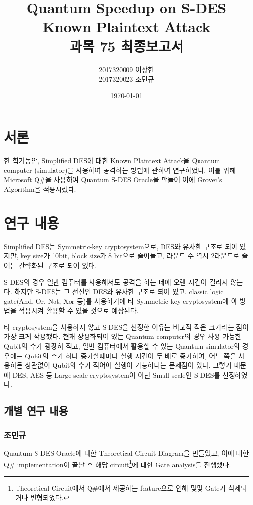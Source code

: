 \documentclass{article}
\title{Quantum Speedup on S-DES Known Plaintext Attack\\\large 과목 75 최종보고서}
\author{2017320009 이상헌\\2017320023 조민규}
\date{\today}
\theoremstyle{break}
\begin{document}
	\maketitle
	
	\section{서론}
	
	한 학기동안, Simplified DES에 대한 Known Plaintext Attack을 Quantum computer (simulator)을 사용하여 공격하는 방법에 관하여 연구하였다. 이를 위해 Microsoft Q\#을 사용하여 Quantum S-DES Oracle을 만들어 이에 Grover’s Algorithm을 적용시켰다.
	
	\section{연구 내용}
	
	Simplified DES는 Symmetric-key cryptosystem으로, DES와 유사한 구조로 되어 있지만, key size가 10bit, block size가 8 bit으로 줄어들고, 라운드 수 역시 2라운드로 줄어든 간략화된 구조로 되어 있다.
	
	S-DES의 경우 일반 컴퓨터를 사용해서도 공격을 하는 데에 오랜 시간이 걸리지 않는다. 하지만 S-DES는 그 전신인 DES와 유사한 구조로 되어 있고, classic logic gate(And, Or, Not, Xor 등)를 사용하기에 타 Symmetric-key cryptosystem에 이 방법을 적용시켜 활용할 수 있을 것으로 예상된다.
	
	타 cryptosystem을 사용하지 않고 S-DES을 선정한 이유는 비교적 작은 크기라는 점이 가장 크게 작용했다. 현재 상용화되어 있는 Quantum computer의 경우 사용 가능한 Qubit의 수가 굉장히 적고, 일반 컴퓨터에서 활용할 수 있는 Quantum simulator의 경우에는 Qubit의 수가 하나 증가할때마다 실행 시간이 두 배로 증가하여, 어느 쪽을 사용하든 상관없이 Qubit의 수가 적어야 실행이 가능하다는 문제점이 있다. 그렇기 때문에 DES, AES 등 Large-scale cryptosystem이 아닌 Small-scale인 S-DES를 선정하였다.
	
	\subsection{개별 연구 내용}
	
	\subsubsection{조민규}
	
	Quantum S-DES Oracle에 대한 Theoretical Circuit Diagram을 만들었고, 이에 대한 Q\# implementation이 끝난 후 해당 circuit\footnote{Theoretical Circuit에서 Q\#에서 제공하는 feature으로 인해 몇몇 Gate가 삭제되거나 변형되었다.}에 대한 Gate analysis를 진행했다.
	
\end{document}

